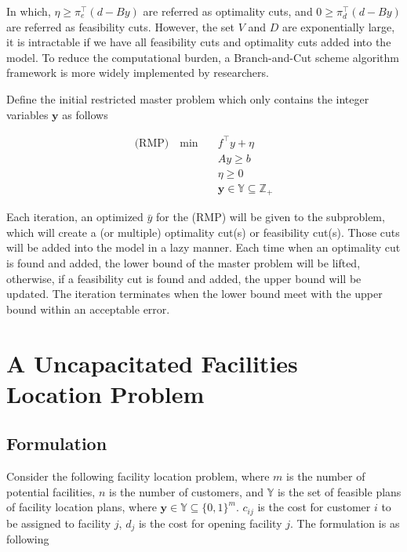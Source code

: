             In which, $\eta \ge \pi_e^\top (d - By)$ are referred as optimality cuts, and $0 \ge \pi_d^\top (d - By)$ are referred as feasibility cuts. However, the set $V$ and $D$ are exponentially large, it is intractable if we have all feasibility cuts and optimality cuts added into the model. To reduce the computational burden, a Branch-and-Cut scheme algorithm framework is more widely implemented by researchers.

            Define the initial restricted master problem which only contains the integer variables $\mathbf{y}$ as follows

            \begin{align*}
                \text{(RMP)} \quad \min \quad &f^\top y + \eta\\
                & Ay \ge b \\
                & \eta \ge 0 \\
                & \mathbf{y} \in \mathbb{Y} \subseteq \mathbb{Z}_+
            \end{align*}

            Each iteration, an optimized $\bar{y}$ for the (RMP) will be given to the subproblem, which will create a (or multiple) optimality cut(s) or feasibility cut(s). Those cuts will be added into the model in a lazy manner. Each time when an optimality cut is found and added, the lower bound of the master problem will be lifted, otherwise, if a feasibility cut is found and added, the upper bound will be updated. The iteration terminates when the lower bound meet with the upper bound within an acceptable error.

        \section{A Uncapacitated Facilities Location Problem}
            \subsection{Formulation}
                Consider the following facility location problem, where $m$ is the number of potential facilities, $n$ is the number of customers, and $\mathbb{Y}$ is the set of feasible plans of facility location plans, where $\mathbf{y} \in \mathbb{Y} \subseteq \{0, 1\}^m$. $c_{ij}$ is the cost for customer $i$ to be assigned to facility $j$, $d_j$ is the cost for opening facility $j$. The formulation is as following
                
